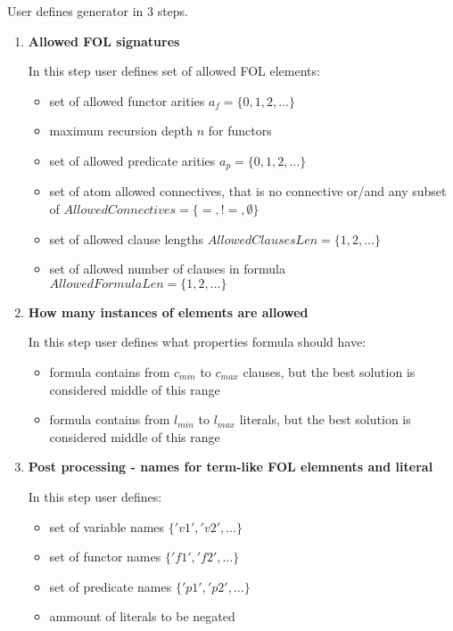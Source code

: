 User defines generator in 3 steps.
\begin{enumerate}
  \item \textbf{Allowed FOL signatures}

    In this step user defines set of allowed \gls{FOL} elements:
    \begin{itemize}
      \item set of allowed functor arities $a_f = \{0, 1, 2,\dots\}$
      \item maximum recursion depth $n$ for functors
      \item set of allowed predicate arities $a_p = \{0, 1, 2,\dots\}$
      \item set of atom allowed connectives, that is no connective or/and any subset of $AllowedConnectives = \{=, !=, \emptyset\}$
      \item set of allowed clause lengths $AllowedClausesLen = \{1,2,\dots\}$
      \item set of allowed number of clauses in formula $AllowedFormulaLen = \{1,2,\dots\}$
    \end{itemize}
  \item \textbf{How many instances of elements are allowed}

    In this step user defines what properties formula should have:
    \begin{itemize}
      \item formula contains from $c_{min}$ to $c_{max}$ clauses, but the best solution is considered middle of this range
      \item formula contains from $l_{min}$ to $l_{max}$ literals, but the best solution is considered middle of this range
    \end{itemize}
  \item \textbf{Post processing - names for term-like FOL elemnents and literal}

    In this step user defines:
    \begin{itemize}
      \item set of variable names $\{'v1','v2',\dots\}$
      \item set of functor names $\{'f1','f2',\dots\}$
      \item set of predicate names $\{'p1','p2',\dots\}$
      \item ammount of literals to be negated
    \end{itemize}
\end{enumerate}

